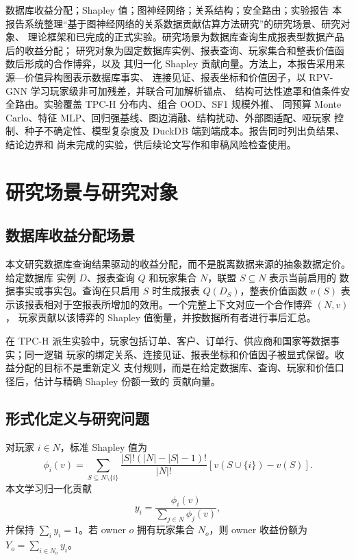 \documentclass{coursepaper}
\begin{document}
\makecoverpage
\maketocpage

\begin{cnabstract}{数据库收益分配；Shapley 值；图神经网络；关系结构；安全路由；实验报告}
本报告系统整理“基于图神经网络的关系数据贡献估算方法研究”的研究场景、研究对象、
理论框架和已完成的正式实验。研究场景为数据库查询生成报表型数据产品后的收益分配；
研究对象为固定数据库实例、报表查询、玩家集合和整表价值函数后形成的合作博弈，以及
其归一化 Shapley 贡献向量。方法上，本报告采用来源—价值异构图表示数据库事实、
连接见证、报表坐标和价值因子，以 RPV-GNN 学习玩家级非可加残差，并联合可加解析锚点、
结构可达性遮罩和值条件安全路由。实验覆盖 TPC-H 分布内、组合 OOD、SF1 规模外推、
同预算 Monte Carlo、特征 MLP、回归强基线、图边消融、结构扰动、外部图适配、哑玩家
控制、种子不确定性、模型复杂度及 DuckDB 端到端成本。报告同时列出负结果、结论边界和
尚未完成的实验，供后续论文写作和审稿风险检查使用。
\end{cnabstract}

\beginmainmatter

\section{研究场景与研究对象}

\subsection{数据库收益分配场景}

本文研究数据库查询结果驱动的收益分配，而不是脱离数据来源的抽象数据定价。给定数据库
实例 \(D\)、报表查询 \(Q\) 和玩家集合 \(N\)，联盟 \(S\subseteq N\) 表示当前启用的
数据事实或事实包。查询在只启用 \(S\) 时生成报表 \(Q(D_S)\)，整表价值函数 \(v(S)\)
表示该报表相对于空报表所增加的效用。一个完整上下文对应一个合作博弈 \((N,v)\)，
玩家贡献以该博弈的 Shapley 值衡量，并按数据所有者进行事后汇总。

在 TPC-H 派生实验中，玩家包括订单、客户、订单行、供应商和国家等数据事实；同一逻辑
玩家的绑定关系、连接见证、报表坐标和价值因子被显式保留。收益分配的目标不是重新定义
支付规则，而是在给定数据库、查询、玩家和价值口径后，估计与精确 Shapley 份额一致的
贡献向量。

\subsection{形式化定义与研究问题}

对玩家 \(i\in N\)，标准 Shapley 值为
\begin{equation}
  \phi_i(v)=
  \sum_{S\subseteq N\setminus\{i\}}
  \frac{|S|!(|N|-|S|-1)!}{|N|!}
  \left[v(S\cup\{i\})-v(S)\right].
  \label{eq:shapley}
\end{equation}
本文学习归一化贡献
\[
  y_i=\frac{\phi_i(v)}{\sum_{j\in N}\phi_j(v)},
\]
并保持 \(\sum_i y_i=1\)。若 owner \(o\) 拥有玩家集合 \(N_o\)，则 owner 收益份额为
\(Y_o=\sum_{i\in N_o}y_i\)。
\end{document}
